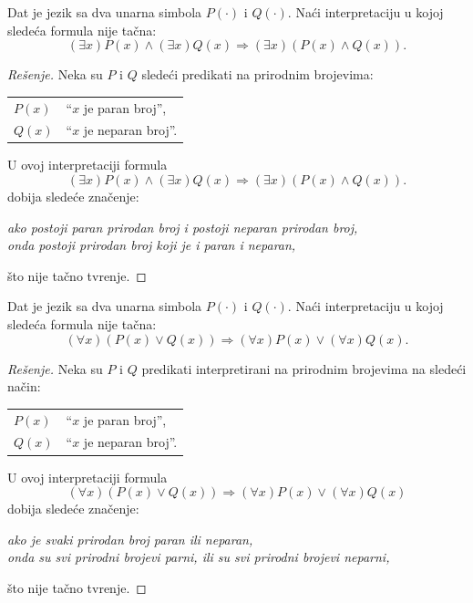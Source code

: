 \begin{EX}
  Dat je jezik sa dva unarna simbola $P(\cdot)$ i $Q(\cdot)$. Na\'ci interpretaciju u kojoj slede\'ca
  formula nije ta\v cna:
  $$
    (\exists x)P(x) \land (\exists x)Q(x) \Rightarrow (\exists x)(P(x) \land Q(x)).
  $$
\end{EX}
\begin{proof}[Re\v senje]
  Neka su $P$ i $Q$ slede\'ci predikati na prirodnim brojevima:

  \medskip

  \begin{tabular}{l@{\quad$\leadsto$\quad}l}
    $P(x)$ & \enquote{$x$ je paran broj},\\
    $Q(x)$ & \enquote{$x$ je neparan broj}.
  \end{tabular}
  
  \medskip
  
  \noindent
  U ovoj interpretaciji formula
  $$
    (\exists x)P(x) \land (\exists x)Q(x) \Rightarrow (\exists x)(P(x) \land Q(x)).
  $$
  dobija slede\'ce zna\v cenje:
  \begin{center}
    \textit{ako postoji paran prirodan broj i postoji neparan prirodan broj,}\\
    \textit{onda postoji prirodan broj koji je i paran i neparan,}
  \end{center}
  \v sto nije ta\v cno tvr\dj enje.
\end{proof}

\begin{EX}
  Dat je jezik sa dva unarna simbola $P(\cdot)$ i $Q(\cdot)$. Na\'ci interpretaciju u kojoj slede\'ca
  formula nije ta\v cna:
  $$
    (\forall x)(P(x) \lor Q(x)) \Rightarrow (\forall x)P(x) \lor (\forall x)Q(x).
  $$
\end{EX}
\begin{proof}[Re\v senje]
  Neka su $P$ i $Q$ predikati interpretirani na prirodnim brojevima na slede\'ci na\v cin:

  \medskip

  \begin{tabular}{l@{\quad$\leadsto$\quad}l}
    $P(x)$ & \enquote{$x$ je paran broj},\\
    $Q(x)$ & \enquote{$x$ je neparan broj}.
  \end{tabular}
  
  \medskip
  
  \noindent
  U ovoj interpretaciji formula
  $$
    (\forall x)(P(x) \lor Q(x)) \Rightarrow (\forall x)P(x) \lor (\forall x)Q(x)
  $$
  dobija slede\'ce zna\v cenje:
  \begin{center}
    \textit{ako je svaki prirodan broj paran ili neparan,}\\
    \textit{onda su svi prirodni brojevi parni, ili su svi prirodni brojevi neparni,}
  \end{center}
  \v sto nije ta\v cno tvr\dj enje.
\end{proof}



